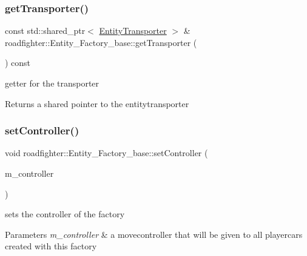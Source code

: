 \subsubsection{\texorpdfstring{get\+Transporter()}{getTransporter()}}
{\footnotesize\ttfamily const std\+::shared\+\_\+ptr$<$ \hyperlink{classroadfighter_1_1EntityTransporter}{Entity\+Transporter} $>$ \& roadfighter\+::\+Entity\+\_\+\+Factory\+\_\+base\+::get\+Transporter (\begin{DoxyParamCaption}{ }\end{DoxyParamCaption}) const}

getter for the transporter \begin{DoxyReturn}{Returns}
a shared pointer to the entitytransporter 
\end{DoxyReturn}
\mbox{\label{classroadfighter_1_1Entity__Factory__base_a6c9363d763f34f39a44eaf02c6cb9f87}} 
\subsubsection{\texorpdfstring{set\+Controller()}{setController()}}
{\footnotesize\ttfamily void roadfighter\+::\+Entity\+\_\+\+Factory\+\_\+base\+::set\+Controller (\begin{DoxyParamCaption}\item[{const std\+::shared\+\_\+ptr$<$ \hyperlink{classroadfighter_1_1InputController}{Input\+Controller} $>$ \&}]{m\+\_\+controller }\end{DoxyParamCaption})}

sets the controller of the factory 
\begin{DoxyParams}{Parameters}
{\em m\+\_\+controller} & a movecontroller that will be given to all playercars created with this factory \\
\hline
\end{DoxyParams}
\mbox{\label{classroadfighter_1_1Entity__Factory__base_ab3338a586002c58ad7581e1046be9ba5}} 
